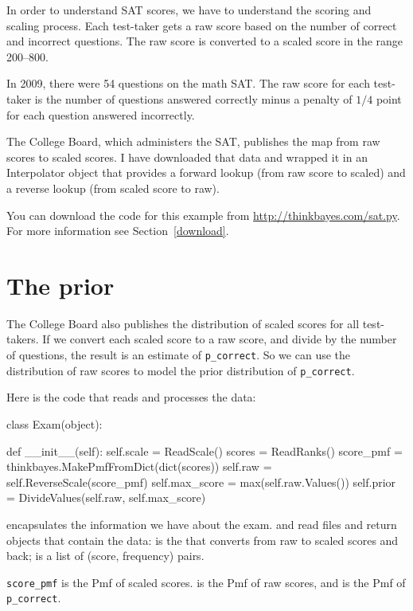 \documentclass[12pt]{book}
\theoremstyle{exercise}
\begin{document}
In order to understand SAT scores, we have to understand the scoring
and scaling process.  Each test-taker gets a raw score based on the
number of correct and incorrect questions.  The raw score is converted
to a scaled score in the range 200--800.

In 2009, there were 54 questions on the math SAT.  The raw score
for each test-taker is the number of questions answered correctly
minus a penalty of $1/4$ point for each question answered incorrectly.

The College Board, which administers the SAT, publishes the
map from raw scores to scaled scores.  I have downloaded that
data and wrapped it in an Interpolator object that provides a forward
lookup (from raw score to scaled) and a reverse lookup (from scaled
score to raw).

You can download the code for this example from
\url{http://thinkbayes.com/sat.py}.
  For more information
see Section~\ref{download}.

\section{The prior}

The College Board also publishes the distribution of scaled scores
for all test-takers.  If we convert each scaled score to a raw score,
and divide by the number of questions, the result is an estimate
of \verb"p_correct".
So we can use the distribution of raw scores to model the
prior distribution of \verb"p_correct".

Here is the code that reads and processes the data:

\begin{code}
class Exam(object):

    def __init__(self):
        self.scale = ReadScale()
        scores = ReadRanks()
        score_pmf = thinkbayes.MakePmfFromDict(dict(scores))
        self.raw = self.ReverseScale(score_pmf)
        self.max_score = max(self.raw.Values())
        self.prior = DivideValues(self.raw, self.max_score)
\end{code}

 encapsulates the information we have about the exam.
 and  read files and return
objects that contain the data:
 is the  that converts
from raw to scaled scores and back;   is a list
of (score, frequency) pairs.

\verb"score_pmf" is the Pmf of
scaled scores.    is the Pmf of raw scores, and
 is the Pmf of \verb"p_correct".
\end{document}

